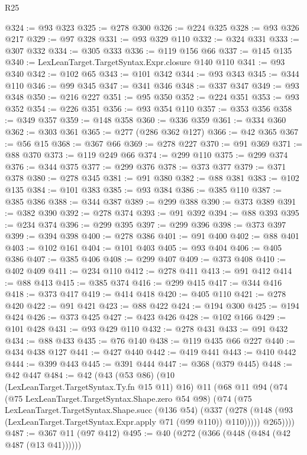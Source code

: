 \begin{lexlean}{R25}
\begin{coremodule}
@324 := @93 @323
@325 := @278 @300
@326 := @224 @325
@328 := @93 @326 @217
@329 := @97 @328
@331 := @93 @329 @110
@332 := @324 @331
@333 := @307 @332
@334 := @305 @333
@336 := @119 @156 @66
@337 := @145 @135
@340 := LexLeanTarget.TargetSyntax.Expr.closure @140 @110
@341 := @93 @340
@342 := @102 @65
@343 := @101 @342
@344 := @93 @343
@345 := @344 @110
@346 := @99 @345
@347 := @341 @346
@348 := @337 @347
@349 := @93 @348
@350 := @216 @227
@351 := @95 @350
@352 := @224 @351
@353 := @93 @352
@354 := @226 @351
@356 := @93 @354 @110
@357 := @353 @356
@358 := @349 @357
@359 := @148 @358
@360 := @336 @359
@361 := @334 @360
@362 := @303 @361
@365 := @277 (@286 @362 @127)
@366 := @42 @365
@367 := @56 @15
@368 := @367 @66
@369 := @278 @227
@370 := @91 @369
@371 := @88 @370
@373 := @119 @249 @66
@374 := @299 @110
@375 := @299 @374
@376 := @344 @375
@377 := @299 @376
@378 := @373 @377
@379 := @371 @378
@380 := @278 @345
@381 := @91 @380
@382 := @88 @381
@383 := @102 @135
@384 := @101 @383
@385 := @93 @384
@386 := @385 @110
@387 := @385 @386
@388 := @344 @387
@389 := @299 @388
@390 := @373 @389
@391 := @382 @390
@392 := @278 @374
@393 := @91 @392
@394 := @88 @393
@395 := @234 @374
@396 := @299 @395
@397 := @299 @396
@398 := @373 @397
@399 := @394 @398
@400 := @278 @386
@401 := @91 @400
@402 := @88 @401
@403 := @102 @161
@404 := @101 @403
@405 := @93 @404
@406 := @405 @386
@407 := @385 @406
@408 := @299 @407
@409 := @373 @408
@410 := @402 @409
@411 := @234 @110
@412 := @278 @411
@413 := @91 @412
@414 := @88 @413
@415 := @385 @374
@416 := @299 @415
@417 := @344 @416
@418 := @373 @417
@419 := @414 @418
@420 := @405 @110
@421 := @278 @420
@422 := @91 @421
@423 := @88 @422
@424 := @194 @300
@425 := @194 @424
@426 := @373 @425
@427 := @423 @426
@428 := @102 @166
@429 := @101 @428
@431 := @93 @429 @110
@432 := @278 @431
@433 := @91 @432
@434 := @88 @433
@435 := @76 @140
@438 := @119 @435 @66 @227
@440 := @434 @438 @127
@441 := @427 @440
@442 := @419 @441
@443 := @410 @442
@444 := @399 @443
@445 := @391 @444
@447 := @368 (@379 @445)
@448 := @42 @447
@484 := @42
    (@43
      (@53 @86)
      (@10 (LexLeanTarget.TargetSyntax.Ty.fn @15 @11) @16)
      @11
      (@68
        @11
        @94
        (@74
          (@75 LexLeanTarget.TargetSyntax.Shape.zero @54 @98)
          (@74
            (@75
              LexLeanTarget.TargetSyntax.Shape.succ
              (@136 @54)
              (@337
                (@278 (@148 (@93 (LexLeanTarget.TargetSyntax.Expr.apply @71 (@99 @110)) @110)))))
            @265))))
@487 := @367 @11 (@97 @412)
@495 := @40 (@272 (@366 (@448 (@484 (@42 @487 (@13 @41))))))

\end{coremodule}
\end{lexlean}
